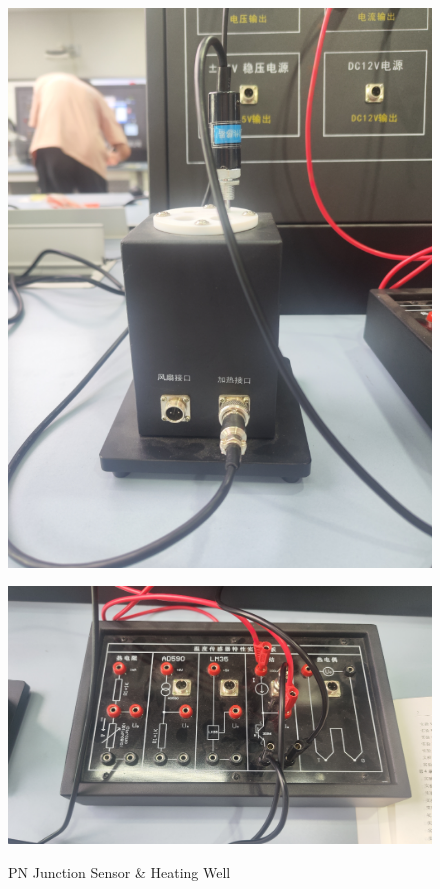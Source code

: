 \documentclass[UTF8]{article}
\begin{document}
	\begin{figure}[H]
	   \begin{minipage}[t]{0.4\linewidth}
	      \centering
	      \includegraphics[clip,scale=0.405,trim={0 0 0 0}]{fig/fig3.png}
	      \label{figure.9}
	   \end{minipage}
	   \begin{minipage}[t]{0.6\linewidth}
	      \centering
	      \includegraphics[clip,scale=0.5,trim={0 0 0 0}]{fig/fig4.png}
	      \label{figure.10}
	   \end{minipage}
	   	  \caption{ PN Junction Sensor \& Heating Well}
	\end{figure} 
	     
\end{document}
